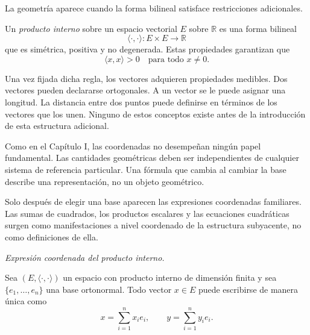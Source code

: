 \medskip

La geometría aparece cuando la forma bilineal satisface restricciones adicionales.


\medskip

Un \emph{producto interno} sobre un espacio vectorial $E$ sobre $\mathbb{R}$
es una forma bilineal
\[
\langle \cdot,\cdot \rangle : E \times E \longrightarrow \mathbb{R}
\]
que es simétrica, positiva y no degenerada.
Estas propiedades garantizan que
\[
\langle x,x \rangle > 0 \quad \text{para todo } x \neq 0.
\]

\medskip

Una vez fijada dicha regla, los vectores adquieren propiedades medibles.
Dos vectores pueden declararse ortogonales.
A un vector se le puede asignar una longitud.
La distancia entre dos puntos puede definirse en términos de los vectores que
los unen.
Ninguno de estos conceptos existe antes de la introducción de esta estructura adicional.

\medskip

Como en el Capítulo I, las coordenadas no desempeñan ningún papel fundamental.
Las cantidades geométricas deben ser independientes de cualquier sistema de
referencia particular.
Una fórmula que cambia al cambiar la base describe una representación,
no un objeto geométrico.

\medskip

Solo después de elegir una base aparecen las expresiones coordenadas familiares.
Las sumas de cuadrados, los productos escalares y las ecuaciones cuadráticas
surgen como manifestaciones a nivel coordenado de la estructura subyacente,
no como definiciones de ella.

\medskip

\textit{Expresión coordenada del producto interno.}

Sea $(E,\langle\cdot,\cdot\rangle)$ un espacio con producto interno de dimensión
finita y sea $\{e_1,\dots,e_n\}$ una base ortonormal.
Todo vector $x\in E$ puede escribirse de manera única como
\[
x=\sum_{i=1}^n x_i e_i,
\qquad
y=\sum_{i=1}^n y_i e_i.
\]

